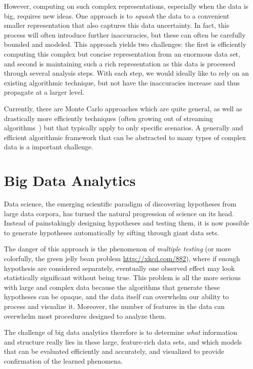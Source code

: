 \documentclass{article}
\begin{document}
However, computing on such complex representations, especially when the data is big, requires new ideas.  
One approach is to \emph{squash} the data to a convenient smaller representation that also captures this data uncertainty.  In fact, this process will often introduce further inaccuracies, but these can often be carefully bounded and modeled.  
This approach yields two challenges: the first is efficiently computing this complex but concise representation from an enormous data set, and second is maintaining such a rich representation as this data is processed through several analysis steps.  With each step, we would ideally like to rely on an existing algorithmic technique, but not have the inaccuracies increase and thus propagate at a larger level.  

Currently, there are Monte Carlo approaches which are quite general, as well as drastically more efficiently techniques (often growing out of streaming algorithms~\cite{streaming}) but that typically apply to only specific scenarios.    
A generally and efficient algorithmic framework that can be abstracted to many types of complex data is a important challenge.  




\section{Big Data Analytics}

Data science, the emerging scientific paradigm of discovering hypotheses from large data corpora, has turned the natural progression of science on its head. Instead of painstakingly designing hypotheses and testing them, it is now possible to generate hypotheses automatically by sifting through giant data sets.

The danger of this approach is the phenomenon of \emph{multiple testing} (or more colorfully, the green jelly bean problem \url{http://xkcd.com/882}), where if enough hypothesis are considered separately, eventually one observed effect may look statistically significant without being true.  
This problem is all the more serious with large and complex data because the algorithms that generate these hypotheses can be opaque, and the data itself can overwhelm our ability to process and visualize it. Moreover, the number of features in the data can overwhelm most
procedures designed to analyze them.  

The challenge of big data analytics therefore is to determine \emph{what} information and structure really lies in these large, feature-rich data sets, and which models that can be evaluated efficiently and accurately, and visualized to provide confirmation of the learned phenomena.
\end{document}
